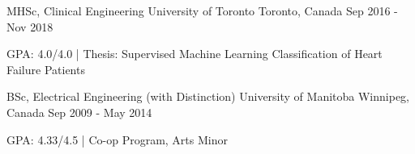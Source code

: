 

\begin{cventries}

  \cventry
  {MHSc, Clinical Engineering} %
  {University of Toronto} %
  {Toronto, Canada} %
  {Sep 2016 - Nov 2018} %
  {
  	\begin{cvitems} %
  		\item[] {GPA: 4.0/4.0 | Thesis: Supervised Machine Learning Classification of Heart Failure Patients}
  	\end{cvitems}
  }

  \cventry
    {BSc, Electrical Engineering {\color{lightgray} (with Distinction)}} %
    {University of Manitoba} %
    {Winnipeg, Canada} %
    {Sep 2009 - May 2014} %
    {
      \begin{cvitems} %
        \item[] {GPA: 4.33/4.5 | Co-op Program, Arts Minor}
      \end{cvitems}
    }

\end{cventries}
